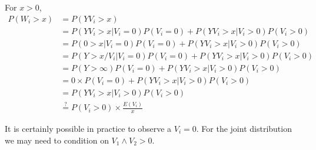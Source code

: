 \documentclass[12pt]{article}
\begin{document}
For $x>0$,
\begin{align*}
P(W_i > x) &= P(YV_i > x)  \\
 &= P(YV_i > x | V_i = 0)P(V_i = 0) + P(YV_i > x | V_i > 0)P(V_i > 0)  \\
 &= P(0 > x | V_i = 0)P(V_i = 0) + P(YV_i > x | V_i > 0)P(V_i > 0)  \\
 &= P(Y>x/V_i|V_i=0) P(V_i = 0) + P(YV_i > x | V_i > 0)P(V_i > 0)  \\
 &= P(Y>\infty) P(V_i = 0) + P(YV_i > x | V_i > 0)P(V_i > 0)  \\
 &= 0\times P(V_i = 0) + P(YV_i > x | V_i > 0)P(V_i > 0)  \\
 &= P(YV_i > x | V_i > 0)P(V_i > 0)  \\
 &\overset{?}{=} P(V_i>0)\times \frac{E(V_i)}{x}
\end{align*}

It is certainly possible in practice to observe a $V_i=0$. For the joint distribution we may need to condition on $V_1 \wedge V_2 > 0$.
\end{document}
